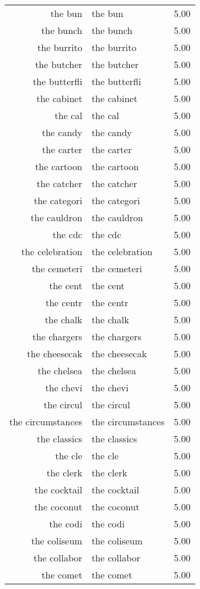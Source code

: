 \begin{table}[ht]
\begin{tabular}{rlr}
  the bun & the bun & 5.00 \\ 
  the bunch & the bunch & 5.00 \\ 
  the burrito & the burrito & 5.00 \\ 
  the butcher & the butcher & 5.00 \\ 
  the butterfli & the butterfli & 5.00 \\ 
  the cabinet & the cabinet & 5.00 \\ 
  the cal & the cal & 5.00 \\ 
  the candy & the candy & 5.00 \\ 
  the carter & the carter & 5.00 \\ 
  the cartoon & the cartoon & 5.00 \\ 
  the catcher & the catcher & 5.00 \\ 
  the categori & the categori & 5.00 \\ 
  the cauldron & the cauldron & 5.00 \\ 
  the cdc & the cdc & 5.00 \\ 
  the celebration & the celebration & 5.00 \\ 
  the cemeteri & the cemeteri & 5.00 \\ 
  the cent & the cent & 5.00 \\ 
  the centr & the centr & 5.00 \\ 
  the chalk & the chalk & 5.00 \\ 
  the chargers & the chargers & 5.00 \\ 
  the cheesecak & the cheesecak & 5.00 \\ 
  the chelsea & the chelsea & 5.00 \\ 
  the chevi & the chevi & 5.00 \\ 
  the circul & the circul & 5.00 \\ 
  the circumstances & the circumstances & 5.00 \\ 
  the classics & the classics & 5.00 \\ 
  the cle & the cle & 5.00 \\ 
  the clerk & the clerk & 5.00 \\ 
  the cocktail & the cocktail & 5.00 \\ 
  the coconut & the coconut & 5.00 \\ 
  the codi & the codi & 5.00 \\ 
  the coliseum & the coliseum & 5.00 \\ 
  the collabor & the collabor & 5.00 \\ 
  the comet & the comet & 5.00 \\ 

\end{tabular}
\end{table}

